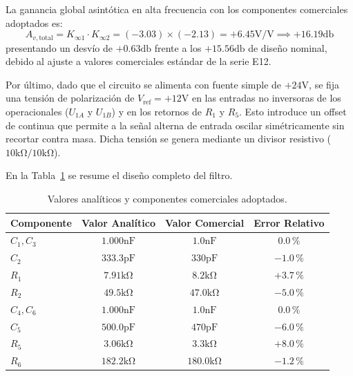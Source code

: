 La ganancia global asintótica en alta frecuencia con los componentes comerciales adoptados es:
\begin{equation*}
    A_{v,\text{total}} = K_{\infty 1} \cdot K_{\infty 2} = (-3.03) \times (-2.13) = +6.45 \unit{\volt\per\volt} \implies +16.19 \unit{\decibel}
\end{equation*}
presentando un desvío de $+0.63 \unit{\decibel}$ frente a los $+15.56 \unit{\decibel}$ de diseño nominal, debido al
ajuste a valores comerciales estándar de la serie E12.

Por último, dado que el circuito se alimenta con fuente simple de $+24 \unit{\volt}$, se fija una tensión de
polarización de $V_{\text{ref}} = +12 \unit{\volt}$ en las entradas no inversoras de los operacionales ($U_{1A}$ y
$U_{1B}$) y en los retornos de $R_1$ y $R_5$. Esto introduce un offset de continua que permite a la señal alterna de
entrada oscilar simétricamente sin recortar contra masa. Dicha tensión se genera mediante un divisor resistivo ($10
\unit{\kilo\ohm} / 10 \unit{\kilo\ohm}$).

En la Tabla~\ref{tab.ej3:resumen_componentes} se resume el diseño completo del filtro.

\begin{table}[!ht]
    \centering
    \caption{Valores analíticos y componentes comerciales adoptados.}
    \label{tab.ej3:resumen_componentes}
    \begin{tabular}{lccc}
        \toprule
        \textbf{Componente} & \textbf{Valor Analítico} & \textbf{Valor Comercial} & \textbf{Error Relativo} \\
        \midrule
        $C_1, C_3$ & $1.000 \unit{\nano\farad}$ & $1.0 \unit{\nano\farad}$ & $0.0\,\%$ \\
        $C_2$      & $333.3 \unit{\pico\farad}$ & $330 \unit{\pico\farad}$ & $-1.0\,\%$ \\
        $R_1$      & $7.91 \unit{\kilo\ohm}$    & $8.2 \unit{\kilo\ohm}$   & $+3.7\,\%$ \\
        $R_2$      & $49.5 \unit{\kilo\ohm}$    & $47.0 \unit{\kilo\ohm}$  & $-5.0\,\%$ \\
        \midrule
        $C_4, C_6$ & $1.000 \unit{\nano\farad}$ & $1.0 \unit{\nano\farad}$ & $0.0\,\%$ \\
        $C_5$      & $500.0 \unit{\pico\farad}$ & $470 \unit{\pico\farad}$ & $-6.0\,\%$ \\
        $R_5$      & $3.06 \unit{\kilo\ohm}$    & $3.3 \unit{\kilo\ohm}$   & $+8.0\,\%$ \\
        $R_6$      & $182.2 \unit{\kilo\ohm}$   & $180.0 \unit{\kilo\ohm}$ & $-1.2\,\%$ \\
        \bottomrule
    \end{tabular}
\end{table}

